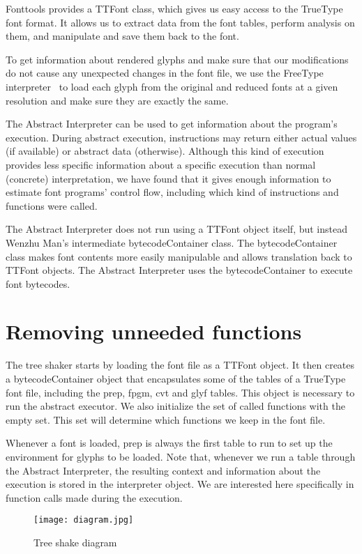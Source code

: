 \documentclass[12pt]{article}
\begin{document}
Fonttools provides a TTFont class, which gives us easy access to the TrueType font format. It
allows us to extract data from the font tables, perform analysis on
them, and manipulate and save them back to the font. 

To get information about rendered glyphs and make sure that
our modifications do not cause any unexpected changes in the font file,
we use the FreeType interpreter~\cite{freetype} to load each glyph from the original
and reduced fonts at a given resolution and make sure they are exactly
the same. 

The Abstract Interpreter can be used to get information about the
program's execution. During abstract execution, instructions may return either
actual values (if available) or abstract data (otherwise). Although this kind of
execution provides less specific information about a specific execution than normal (concrete)
interpretation, we have found that it gives enough information to estimate font programs' control flow, including
which kind of instructions and functions were called.

The Abstract
Interpreter does not run using a TTFont object itself, but instead Wenzhu Man's
intermediate bytecodeContainer class.
The bytecodeContainer class makes font contents
more easily manipulable and allows translation back to TTFont
objects. The Abstract Interpreter uses the bytecodeContainer to execute font bytecodes.

\section{Removing unneeded functions}

The tree shaker starts by loading the font file as a TTFont object.
It then creates a bytecodeContainer object that encapsulates some of
the tables of a TrueType font file, including the prep, fpgm, cvt and
glyf tables. This object is necessary to run the abstract executor. We
also initialize the set of called functions with the empty set. This
set will determine which functions we keep in the font file.

Whenever a font is loaded, prep is always the first table to run to 
set up the environment for glyphs to be loaded. Note that, whenever we run
a table through the Abstract Interpreter, the resulting context
and information about the execution is stored in the interpreter object.
We are interested here specifically in function calls made during the execution.

\begin{figure}[ht!]
\centering
\texttt{[image: diagram.jpg]}
\caption{Tree shake diagram \label{overflow}}
\end{figure}
\end{document}
